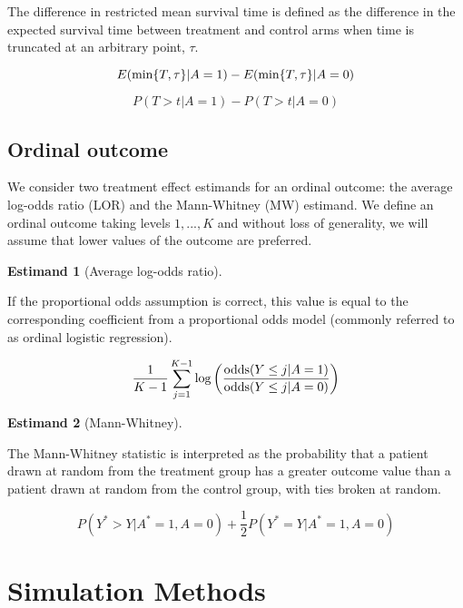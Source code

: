 \documentclass{article}
\begin{document}
The difference in restricted mean survival time is defined as the difference in the expected survival time between treatment and control arms when time is truncated at an arbitrary point, $\tau$.

\[E(\textnormal{min}\{T, \tau\} | A = 1) - E(\textnormal{min}\{T, \tau\} | A = 0)\]

\begin{surv}
\label{rmst}
\end{surv}
\[P(T > t | A = 1) - P(T > t | A = 0)\]

\subsection{Ordinal outcome}

\newtheorem{ord}{Estimand}

We consider two treatment effect estimands for an ordinal outcome: the average log-odds ratio (LOR) and the Mann-Whitney (MW) estimand. We define an ordinal outcome taking levels $1, ..., K$ and without loss of generality, we will assume that lower values of the outcome are preferred. 

\begin{ord}[Average log-odds ratio]
\label{lor}
\end{ord}

If the proportional odds assumption is correct, this value is equal to the corresponding coefficient from a proportional odds model (commonly referred to as ordinal logistic regression).

\[\frac{1}{K - 1} \sum_{j = 1}^{K - 1}\textnormal{log} \left( \frac{\textnormal{odds}(Y \leq j | A = 1)}{\textnormal{odds}(Y \leq j | A = 0)} \right)\]

\begin{ord}[Mann-Whitney]
\label{MW}
\end{ord}

The Mann-Whitney statistic is interpreted as the probability that a patient drawn at random from the treatment group has a greater outcome value than a patient drawn at random from the control group, with ties broken at random.

\[ P(Y^* > Y|A^* = 1, A = 0) + \frac{1}{2}P(Y^* = Y |A^* = 1, A = 0) \]

\section{Simulation Methods}
\end{document}
